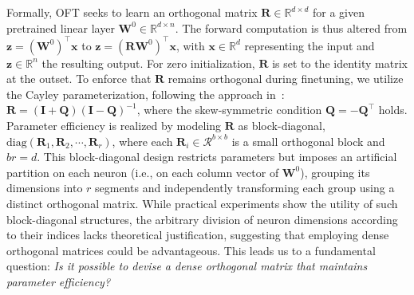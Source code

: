 Formally, OFT seeks to learn an orthogonal matrix $\bm{R}\in\mathbb{R}^{d\times d}$ for a given pretrained linear layer $\bm{W}^0\in\mathbb{R}^{d\times n}$. The forward computation is thus altered from $\bm{z}=(\bm{W}^0)^\top\bm{x}$ to $\bm{z}=(\bm{R}\bm{W}^0)^\top\bm{x}$, with $\bm{x}\in\mathbb{R}^d$ representing the input and $\bm{z}\in\mathbb{R}^n$ the resulting output. For zero initialization, $\bm{R}$ is set to the identity matrix at the outset. To enforce that $\bm{R}$ remains orthogonal during finetuning, we utilize the Cayley parameterization, following the approach in~\cite{qiu2023controlling,liu2021orthogonal}: $\bm{R}=(\bm{I}+\bm{Q})(\bm{I}-\bm{Q})^{-1}$, where the skew-symmetric condition $\bm{Q}=-\bm{Q}^\top$ holds. Parameter efficiency is realized by modeling $\bm{R}$ as block-diagonal, $\text{diag}(\bm{R}_1,\bm{R}_2,\cdots,\bm{R}_r)$, where each $\bm{R}_i\in\mathcal{R}^{b\times b}$ is a small orthogonal block and $br = d$. This block-diagonal design restricts parameters but imposes an artificial partition on each neuron (i.e., on each column vector of $\bm{W}^0$), grouping its dimensions into $r$ segments and independently transforming each group using a distinct orthogonal matrix. While practical experiments show the utility of such block-diagonal structures, the arbitrary division of neuron dimensions according to their indices lacks theoretical justification, suggesting that employing dense orthogonal matrices could be advantageous. This leads us to a fundamental question: \emph{Is it possible to devise a dense orthogonal matrix that maintains parameter efficiency?}


